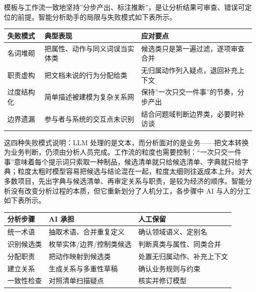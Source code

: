 \documentclass[12pt,a4paper,twoside,openany]{ctexbook}
\numberwithin{figure}{chapter}
\numberwithin{table}{chapter}
\newcounter{none}
\begin{document}
模板与工作流一致地坚持''分步产出、标注推断''，是让分析结果可审查、错误可定位的前提。智能分析助手的局限与失败模式如下表所示。

{\def\LTcaptype{none} %
\begin{longtable}[]{@{}
  >{\raggedright\arraybackslash}p{}
  >{\raggedright\arraybackslash}p{}
  >{\raggedright\arraybackslash}p{}@{}}
\toprule\noalign{}
\begin{minipage}[b]{\linewidth}\raggedright
失败模式
\end{minipage} & \begin{minipage}[b]{\linewidth}\raggedright
典型表现
\end{minipage} & \begin{minipage}[b]{\linewidth}\raggedright
应对要点
\end{minipage} \\
\midrule\noalign{}
\endhead
\bottomrule\noalign{}
\endlastfoot
名词堆砌 & 把属性、动作与同义词误当实体类 &
候选类只是第一遍过滤，逐项审查合并 \\
职责虚构 & 把文档未说的行为分配给类 &
无归属动作列入疑点，退回补充上下文 \\
过度结构化 & 简单描述被建模为复杂关系网 &
保持''一次只交一件事''的节奏，分步产出 \\
边界遗漏 & 参与者与系统的交互点未识别 &
结合问题域判断边界类，必要时补访谈 \\
\end{longtable}
}

这四种失败模式说明：LLM
处理的是文本，而分析面对的是业务------把文本转换为业务判断，仍须由分析人员完成。工作流的粒度也需要控制：``一次只交一件事''意味着每个提示词只索取一种制品，候选清单就只给候选清单、字典就只给字典；粒度太粗时模型容易把候选与结论混在一起，粒度太细则往返成本上升。对大多数项目，先出字典与候选清单、再审定关系与职责，是较为经济的顺序。智能分析没有改变分析过程的本质，但它重新划分了人机分工，各步骤中
AI 与人的分工如下表所示。

{\def\LTcaptype{none} %
\begin{longtable}[]{@{}lll@{}}
\toprule\noalign{}
分析步骤 & AI 承担 & 人工保留 \\
\midrule\noalign{}
\endhead
\bottomrule\noalign{}
\endlastfoot
统一术语 & 抽取术语、合并重复定义 & 确认领域语义、定别名 \\
识别候选类 & 枚举实体/边界/控制类候选 & 判断真类与属性、同类合并 \\
分配职责 & 把动作映射到候选类 & 处置无归属动作、补充上下文 \\
建立关系 & 生成关系与多重性草稿 & 确认业务规则与约束 \\
一致性检查 & 对照清单扫描疑点 & 核实并修订模型 \\
\end{longtable}
}
\end{document}
